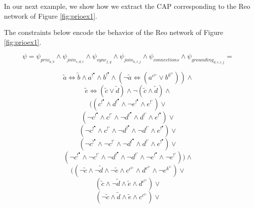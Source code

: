 
In our next example, we show how we extract the CAP corresponding to the Reo network of Figure \ref{fig:prioex1}.

\begin{BehExample}
The constraints below encode the behavior of the Reo network of Figure \ref{fig:prioex1}.  

      $$\psi = \psi_{prio_{a,b}} \wedge \psi_{join_{c,d,e}} \wedge \psi_{sync_{f,g}} \wedge \psi_{join_{h,i,j}} \wedge \psi_{connections} \wedge \psi_{grounding_{d,e,i,j}} = $$%
      
      $$\tilde{a} \Leftrightarrow \tilde{b} \wedge a^{!^\bullet} \wedge b^{!^\bullet} \wedge (\neg \tilde{a} \Leftrightarrow (a^{c^\triangleright} \vee b^{k^\triangleright})) \wedge$$ 
      $$\tilde{e} \Leftrightarrow (\tilde{c} \vee \tilde{d}) \wedge \neg (\tilde{c} \wedge \tilde{d}) \wedge $$
	  $$ ((c^{!^\bullet} \wedge d^{!^\bullet} \wedge \neg e^{!^\bullet} \wedge e^{!^\circ}) \vee $$
	  $$ (\neg c^{!^\bullet} \wedge c^{!^\circ} \wedge \neg d^{!^\bullet} \wedge d^{!^\circ} \wedge e^{!^\bullet}) \vee $$
	  $$ (\neg c^{!^\bullet} \wedge c^{!^\circ} \wedge \neg d^{!^\bullet} \wedge \neg d^{!^\circ} \wedge e^{!^\bullet}) \vee $$    
      $$ (\neg c^{!^\bullet} \wedge \neg c^{!^\circ} \wedge \neg d^{!^\bullet} \wedge d^{!^\circ} \wedge e^{!^\bullet}) \vee $$    
      $$ (\neg c^{!^\bullet} \wedge \neg c^{!^\circ} \wedge \neg d^{!^\bullet}  \wedge \neg d^{!^\circ} \wedge \neg e^{!^\bullet} \wedge \neg e^{!^\circ})) \wedge$$
% 
%      
%      
      $$((\neg \tilde{c} \wedge \neg \tilde{d} \wedge \neg \tilde{e} \wedge c^{c^\triangleright} \wedge d^{c^\triangleright} \wedge \neg e^{k^\triangleright}) \vee $$ 
      $$(\tilde{c} \wedge \neg \tilde{d} \wedge \tilde{e} \wedge d^{c^\triangleright}) \vee $$
      $$(\neg \tilde{c} \wedge \tilde{d} \wedge \tilde{e} \wedge c^{c^\triangleright}) \vee $$ 

\end{BehExample}
